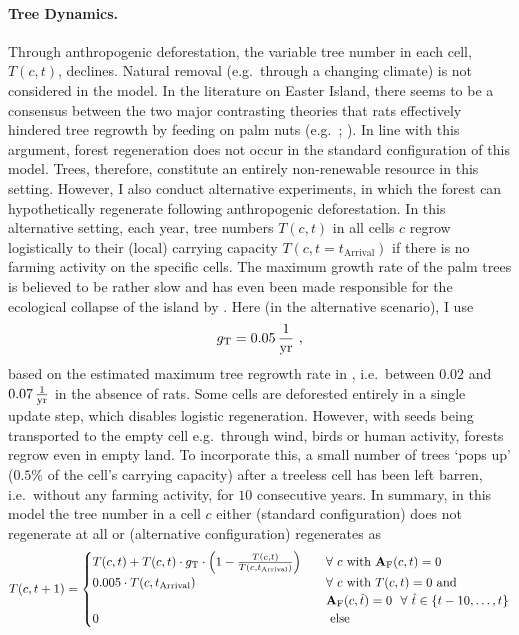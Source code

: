 \paragraph{Tree Dynamics.}
Through anthropogenic deforestation, the variable tree number in each cell, $T(c,t)$, declines.
Natural removal (e.g.\ through a changing climate) is not considered in the model.
In the literature on Easter Island, there seems to be a consensus between the two major contrasting theories that rats effectively hindered tree regrowth by feeding on palm nuts (e.g.\ ; ).
In line with this argument, forest regeneration does not occur in the standard configuration of this model.
Trees, therefore, constitute an entirely non-renewable resource in this setting. 
However, I also conduct alternative experiments, in which the forest can hypothetically regenerate following anthropogenic deforestation.
In this alternative setting, each year, tree numbers $T(c,t)$ in all cells $c$ regrow logistically to their (local) carrying capacity $T(c,t=t_\text{Arrival})$ if there is no farming activity on the specific cells.
The maximum growth rate of the palm trees is believed to be rather slow and has even been made responsible for the ecological collapse of the island by \citet{Brander1998}.
Here (in the alternative scenario), I use
\begin{equation}
g_{\rm T} = 0.05\, {\rm \frac{1}{yr}} \ ,
\end{equation}
based on the estimated maximum tree regrowth rate in \citet{Brandt2015}, i.e.\ between $0.02$ and $0.07\, {\rm \frac{1}{yr}}$ in the absence of rats.
Some cells are deforested entirely in a single update step, which disables logistic regeneration. 
However, with seeds being transported to the empty cell e.g.\ through wind, birds or human activity, forests regrow even in empty land.
To incorporate this, a small number of trees `pops up' ($0.5\%$ of the cell's carrying capacity) after a treeless cell has been left barren, i.e.\ without any farming activity, for $10$ consecutive years.
In summary, in this model the tree number in a cell $c$ either (standard configuration) does not regenerate at all or (alternative configuration) regenerates as
\begin{equation}\label{eq:treeupdate}
T(c,t+1)= \begin{cases}
T(c,t) + T(c,t) \cdot g_{\rm T} \cdot \left(1- \frac{T(c,t)}{T(c,t_{\rm Arrival})}\right) \quad & \forall \ c \text{ with } \mathbf{A}_{\rm F}(c,t)=0 \\
0.005 \cdot T(c,t_{\rm Arrival})  & \forall  \ c \text{ with } T(c,t)=0 \text{ and}\\
& \mathbf{A}_{\rm F}(c,\hat{t})=0 \  \ \forall \  \hat{t} \in \{t-10, \ldots, t\} \\
0 & \text{ else }
\end{cases}
\end{equation}

